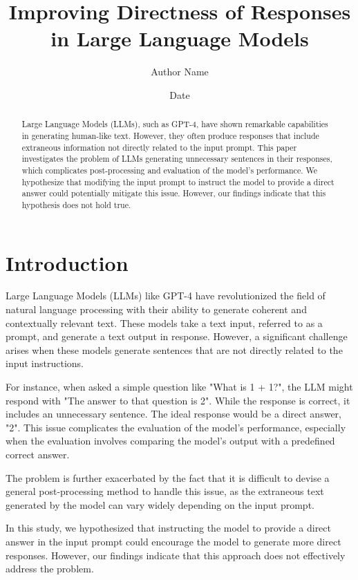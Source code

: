 \documentclass{article}
\title{Improving Directness of Responses in Large Language Models}
\author{Author Name}
\date{Date}
\begin{document}
\maketitle

\begin{abstract}
Large Language Models (LLMs), such as GPT-4, have shown remarkable capabilities in generating human-like text. However, they often produce responses that include extraneous information not directly related to the input prompt. This paper investigates the problem of LLMs generating unnecessary sentences in their responses, which complicates post-processing and evaluation of the model's performance. We hypothesize that modifying the input prompt to instruct the model to provide a direct answer could potentially mitigate this issue. However, our findings indicate that this hypothesis does not hold true.
\end{abstract}

\section{Introduction}

Large Language Models (LLMs) like GPT-4 have revolutionized the field of natural language processing with their ability to generate coherent and contextually relevant text. These models take a text input, referred to as a prompt, and generate a text output in response. However, a significant challenge arises when these models generate sentences that are not directly related to the input instructions. 

For instance, when asked a simple question like "What is 1 + 1?", the LLM might respond with "The answer to that question is 2". While the response is correct, it includes an unnecessary sentence. The ideal response would be a direct answer, "2". This issue complicates the evaluation of the model's performance, especially when the evaluation involves comparing the model's output with a predefined correct answer. 

The problem is further exacerbated by the fact that it is difficult to devise a general post-processing method to handle this issue, as the extraneous text generated by the model can vary widely depending on the input prompt. 

In this study, we hypothesized that instructing the model to provide a direct answer in the input prompt could encourage the model to generate more direct responses. However, our findings indicate that this approach does not effectively address the problem. 
\end{document}
